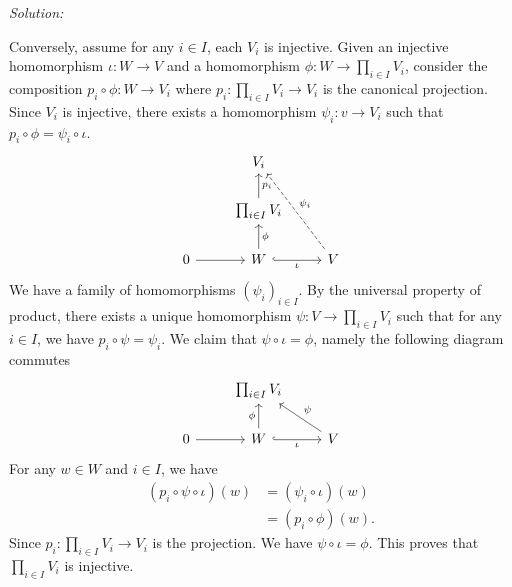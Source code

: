 \documentclass[a4paper, 12pt]{article}
\newenvironment{solution}
    {\textit{Solution:}}
    {}
\begin{document}
\begin{solution}
\begin{enumerate}[(1)]
Conversely, assume for any \(i\in I\), each \(V_i\) is injective. Given an injective homomorphism \(\iota:W\rightarrow V\) and a homomorphism \(\phi:W\rightarrow \prod_{i\in I}V_i\), consider the composition 
\(p_i\circ \phi:W\rightarrow V_i\) where \(p_i:\prod_{i\in I}V_i\rightarrow V_i\) is the canonical projection. Since \(V_i\) is injective, there exists a homomorphism \(\psi_i:v\rightarrow V_i\) such that \(p_i\circ \phi=\psi_i\circ \iota\). 
\[\begin{tikzcd}
	& {V_i} \\
	& {\prod_{i\in I}V_i} \\
	0 & W & V
	\arrow["{p_i}"', from=2-2, to=1-2]
	\arrow[from=3-1, to=3-2]
	\arrow["\phi"', from=3-2, to=2-2]
	\arrow["\iota"', hook, from=3-2, to=3-3]
	\arrow["{\psi_i}"', dashed, from=3-3, to=1-2]
\end{tikzcd}\]
We have a family of homomorphisms \((\psi_i)_{i\in I}\). By the universal property of product, there exists a unique homomorphism \(\psi:V\rightarrow \prod_{i\in I}V_i\) such that for any \(i\in I\), we have \(p_i\circ \psi=\psi_i\). We claim that \(\psi\circ \iota=\phi\), namely 
the following diagram commutes
\[\begin{tikzcd}
	& {\prod_{i\in I}V_i} \\
	0 & W & V
	\arrow[from=2-1, to=2-2]
	\arrow["\phi", from=2-2, to=1-2]
	\arrow["\iota"', hook, from=2-2, to=2-3]
	\arrow["\psi"', from=2-3, to=1-2]
\end{tikzcd}\]
For any \(w\in W\) and \(i\in I\), we have 
\begin{align*}
    (p_i\circ\psi\circ \iota)(w)&=(\psi_i\circ \iota)(w)\\ 
                                &=(p_i\circ \phi)(w).
\end{align*}
Since \(p_i:\prod_{i\in I}V_i\rightarrow V_i\) is the projection. We have \(\psi\circ \iota=\phi\). This proves that \(\prod_{i\in I}V_i\) is injective.
\end{enumerate}
\end{solution}
\end{document}

